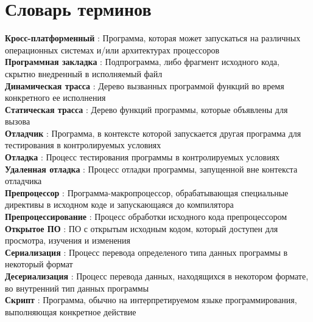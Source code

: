 \chapter*{Словарь терминов}             %

\textbf{Кросс-платформенный} : Программа, которая может запускаться на различных операционных системах и/или архитектурах процессоров \\
\textbf{Программная закладка} : Подпрограмма, либо фрагмент исходного кода, скрытно внедренный в исполняемый файл \\
\textbf{Динамическая трасса} : Дерево вызванных программой функций во время конкретного ее исполнения \\
\textbf{Статическая трасса} : Дерево функций программы, которые объявлены для вызова \\
\textbf{Отладчик} : Программа, в контексте которой запускается другая программа для тестирования в контролируемых условиях \\
\textbf{Отладка} : Процесс тестирования программы в контролируемых условиях \\
\textbf{Удаленная отладка} : Процесс отладки программы, запущенной вне контекста отладчика \\
\textbf{Препроцессор} : Программа-макропроцессор, обрабатывающая специальные директивы в исходном коде и запускающаяся до компилятора  \\
\textbf{Препроцессирование} : Процесс обработки исходного кода препроцессором \\
\textbf{Открытое ПО} : ПО с открытым исходным кодом, который доступен для просмотра, изучения и изменения \\
\textbf{Сериализация} : Процесс перевода определеного типа данных программы в некоторый формат\\
\textbf{Десериализация} : Процесс перевода данных, находящихся в некотором формате, во внутренний тип данных программы\\
\textbf{Скрипт} : Программа, обычно на интерпретируемом языке программирования, выполняющая конкретное действие \\
